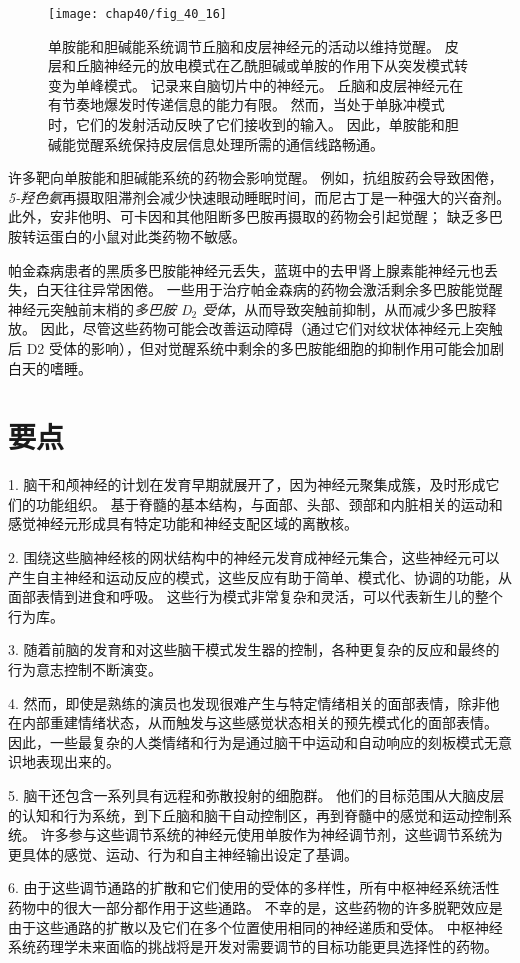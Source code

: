 \begin{figure}[htbp]
	\centering
	\texttt{[image: chap40/fig\_40\_16]}
	\caption{单胺能和胆碱能系统调节丘脑和皮层神经元的活动以维持觉醒。
		皮层和丘脑神经元的放电模式在乙酰胆碱或单胺的作用下从突发模式转变为单峰模式。
		记录来自脑切片中的神经元。
		丘脑和皮层神经元在有节奏地爆发时传递信息的能力有限。
		然而，当处于单脉冲模式时，它们的发射活动反映了它们接收到的输入。
		因此，单胺能和胆碱能觉醒系统保持皮层信息处理所需的通信线路畅通。}
	\label{fig:40_16}
\end{figure}


许多靶向单胺能和胆碱能系统的药物会影响觉醒。
例如，抗组胺药会导致困倦，\textit{5-羟色氨}再摄取阻滞剂会减少快速眼动睡眠时间，而尼古丁是一种强大的兴奋剂。
此外，安非他明、可卡因和其他阻断多巴胺再摄取的药物会引起觉醒；
缺乏多巴胺转运蛋白的小鼠对此类药物不敏感。


帕金森病患者的黑质多巴胺能神经元丢失，蓝斑中的去甲肾上腺素能神经元也丢失，白天往往异常困倦。
一些用于治疗帕金森病的药物会激活剩余多巴胺能觉醒神经元突触前末梢的\textit{多巴胺 D$_2$ 受体}，从而导致突触前抑制，从而减少多巴胺释放。
因此，尽管这些药物可能会改善运动障碍（通过它们对纹状体神经元上突触后 D2 受体的影响），但对觉醒系统中剩余的多巴胺能细胞的抑制作用可能会加剧白天的嗜睡。



\section{要点}

1. 脑干和颅神经的计划在发育早期就展开了，因为神经元聚集成簇，及时形成它们的功能组织。
基于脊髓的基本结构，与面部、头部、颈部和内脏相关的运动和感觉神经元形成具有特定功能和神经支配区域的离散核。


2. 围绕这些脑神经核的网状结构中的神经元发育成神经元集合，这些神经元可以产生自主神经和运动反应的模式，这些反应有助于简单、模式化、协调的功能，从面部表情到进食和呼吸。
这些行为模式非常复杂和灵活，可以代表新生儿的整个行为库。


3. 随着前脑的发育和对这些脑干模式发生器的控制，各种更复杂的反应和最终的行为意志控制不断演变。


4. 然而，即使是熟练的演员也发现很难产生与特定情绪相关的面部表情，除非他在内部重建情绪状态，从而触发与这些感觉状态相关的预先模式化的面部表情。
因此，一些最复杂的人类情绪和行为是通过脑干中运动和自动响应的刻板模式无意识地表现出来的。


5. 脑干还包含一系列具有远程和弥散投射的细胞群。
他们的目标范围从大脑皮层的认知和行为系统，到下丘脑和脑干自动控制区，再到脊髓中的感觉和运动控制系统。
许多参与这些调节系统的神经元使用单胺作为神经调节剂，这些调节系统为更具体的感觉、运动、行为和自主神经输出设定了基调。


6. 由于这些调节通路的扩散和它们使用的受体的多样性，所有中枢神经系统活性药物中的很大一部分都作用于这些通路。
不幸的是，这些药物的许多脱靶效应是由于这些通路的扩散以及它们在多个位置使用相同的神经递质和受体。
中枢神经系统药理学未来面临的挑战将是开发对需要调节的目标功能更具选择性的药物。

